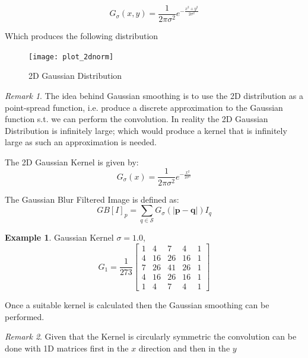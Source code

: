 \documentclass{article}
\theoremstyle{definition}
\newtheorem{ex}{Example}[subsection]
\theoremstyle{remark}
\newtheorem*{rem}{Remark}
\begin{document}
\begin{equation}
    G_{\sigma}(x, y) = \frac{1}{2\pi\sigma^2}e^{-\frac{x^2 + y^2}{2 \sigma^2}}
\end{equation}

\noindent Which produces the following distribution

\begin{figure}[h!]
    \centering
    \texttt{[image: plot\_2dnorm]}
    \caption{2D Gaussian Distribution}
    \label{fig:2d_norm}
\end{figure}

\begin{rem}
The idea behind Gaussian smoothing is to use the 2D distribution as a point-spread function, i.e. produce a discrete approximation to the Gaussian function s.t. we can perform the convolution. In reality the 2D Gaussian Distribution is infinitely large; which would produce a kernel that is infinitely large as such an approximation is needed.
\end{rem}

\noindent The 2D Gaussian Kernel is given by:
\begin{equation}
    G_{\sigma}(x) = \frac{1}{2\pi\sigma^2}e^{-\frac{x^2}{2 \sigma^2}}
\end{equation}

\hfill

\noindent The Gaussian Blur Filtered Image is defined as:
\begin{equation}
    GB[I]_p = \sum_{q \in \mathcal{S}} G_{\sigma}(|\pmb{p} - \pmb{q}|)I_q
\end{equation}

\begin{ex} Gaussian Kernel $ \sigma = 1.0 $, 
\begin{equation*}
    G_{1} = \frac{1}{273}\begin{bmatrix}
	1 & 4  & 7  & 4  & 1 \\
	4 & 16 & 26 & 16 & 1 \\
	7 & 26 & 41 & 26 & 1 \\
	4 & 16 & 26 & 16 & 1 \\
	1 & 4  & 7  & 4  & 1
    \end{bmatrix}
\end{equation*}
\end{ex}

\noindent Once a suitable kernel is calculated then the Gaussian smoothing can be performed.

\begin{rem}
    Given that the Kernel is circularly symmetric the convolution can be done with 1D matrices first in the $ x $ direction and then in the $ y $ 
\end{rem}
\end{document}
